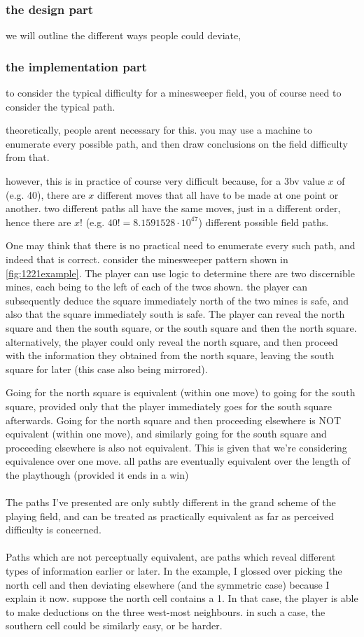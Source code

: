 \subsubsection{the design part}
we will outline the different ways people could deviate, 


\subsubsection{the implementation part}
to consider the typical difficulty for a minesweeper field, you of course need to consider the typical path.

theoretically, people arent necessary for this.
you may use a machine to enumerate every possible path,
and then draw conclusions on the field difficulty from that.

however, this is in practice of course very difficult because, for a 3bv value $x$ of (e.g. 40), there are $x$ different moves that all have to be made at one point or another. two different paths all have the same moves, just in a different order, hence there are $x!$ (e.g. $40! = 8.1591528 \cdot 10 ^{47}$) different possible field paths.

One may think that there is no practical need to enumerate every such path, and indeed that is correct.
consider the minesweeper pattern shown in \cref{fig:1221example}. The player can use logic to determine there are two discernible mines,
each being to the left of each of the twos shown. the player can subsequently deduce the square immediately north of the two mines is safe, and also that the square immediately south is safe.
The player can reveal the north square and then the south square, or the south square and then the north square.
alternatively, the player could only reveal the north square, and then proceed with the information they obtained from the north square, leaving the south square for later (this case also being mirrored).

Going for the north square is equivalent (within one move) to going for the south square, provided only that the player immediately goes for the south square afterwards.
Going for the north square and then proceeding elsewhere is NOT equivalent (within one move), and similarly going for the south square and proceeding elsewhere is also not equivalent.
This is given that we're considering equivalence over one move. all paths are eventually equivalent over the length of the playthough (provided it ends in a win)
\\ \\
The paths I've presented are only subtly different in the grand scheme of the playing field, and can be treated as practically equivalent as far as perceived difficulty is concerned.
\\ \\
Paths which are not perceptually equivalent, are paths which reveal different types of information earlier or later.
In the example, I glossed over picking the north cell and then deviating elsewhere (and the symmetric case) because I explain it now.
suppose the north cell contains a 1. In that case, the player is able to make deductions on the three west-most neighbours.
in such a case, the southern cell could be similarly easy, or be harder.

